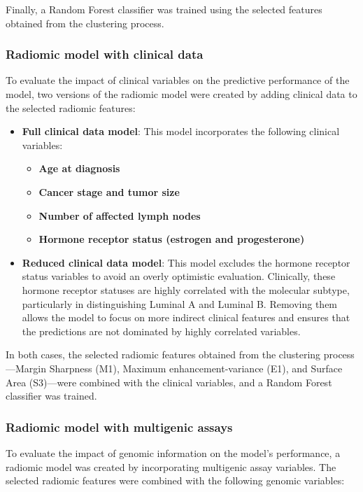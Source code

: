 \documentclass[conference]{IEEEtran}
\begin{document}
Finally, a Random Forest classifier was trained using the selected features obtained from the clustering process.

\subsubsection{Radiomic model with clinical data}

To evaluate the impact of clinical variables on the predictive performance of the model, two versions of the radiomic model were created by adding clinical data to the selected radiomic features:

\begin{itemize}
    \item \textbf{Full clinical data model}: This model incorporates the following clinical variables:
    \begin{itemize}
        \item \textbf{Age at diagnosis}
        \item \textbf{Cancer stage and tumor size}
        \item \textbf{Number of affected lymph nodes}
        \item \textbf{Hormone receptor status (estrogen and progesterone)}
    \end{itemize}
    
    \item \textbf{Reduced clinical data model}: This model excludes the hormone receptor status variables to avoid an overly optimistic evaluation. Clinically, these hormone receptor statuses are highly correlated with the molecular subtype, particularly in distinguishing Luminal A and Luminal B. Removing them allows the model to focus on more indirect clinical features and ensures that the predictions are not dominated by highly correlated variables.
\end{itemize}

In both cases, the selected radiomic features obtained from the clustering process—Margin Sharpness (M1), Maximum enhancement-variance (E1), and Surface Area (S3)—were combined with the clinical variables, and a Random Forest classifier was trained. 


\subsubsection{Radiomic model with multigenic assays}

To evaluate the impact of genomic information on the model’s performance, a radiomic model was created by incorporating multigenic assay variables. The selected radiomic features were combined with the following genomic variables:
\end{document}
